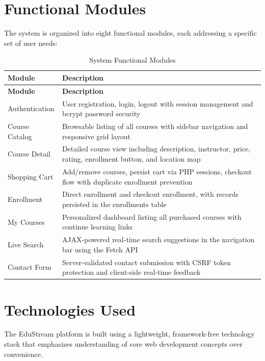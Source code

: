 \documentclass[12pt,a4paper]{report}
\begin{document}
\section{Functional Modules}

The system is organized into eight functional modules, each addressing a specific set of user needs:

\begin{longtable}{|p{3.5cm}|p{10.5cm}|}
    \caption{System Functional Modules}
    \label{tab:modules} \\
    \toprule
    \textbf{Module} & \textbf{Description} \\
    \midrule
    \endfirsthead
    \toprule
    \textbf{Module} & \textbf{Description} \\
    \midrule
    \endhead
    Authentication & User registration, login, logout with session management and bcrypt password security \\
    Course Catalog & Browsable listing of all courses with sidebar navigation and responsive grid layout \\
    Course Detail & Detailed course view including description, instructor, price, rating, enrollment button, and location map \\
    Shopping Cart & Add/remove courses, persist cart via PHP sessions, checkout flow with duplicate enrollment prevention \\
    Enrollment & Direct enrollment and checkout enrollment, with records persisted in the enrollments table \\
    My Courses & Personalized dashboard listing all purchased courses with continue learning links \\
    Live Search & AJAX-powered real-time search suggestions in the navigation bar using the Fetch API \\
    Contact Form & Server-validated contact submission with CSRF token protection and client-side real-time feedback \\
    \bottomrule
\end{longtable}

\section{Technologies Used}

The EduStream platform is built using a lightweight, framework-free technology stack that emphasizes understanding of core web development concepts over convenience.
\end{document}
